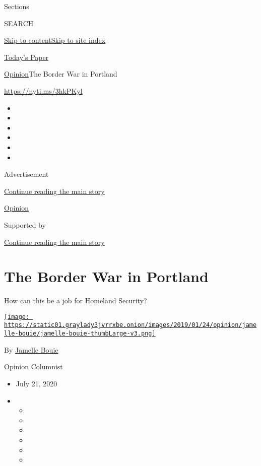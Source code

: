 Sections

SEARCH

\protect\hyperlink{site-content}{Skip to
content}\protect\hyperlink{site-index}{Skip to site index}

\href{https://myaccount.nytimes3xbfgragh.onion/auth/login?response_type=cookie\&client_id=vi}{}

\href{https://www.nytimes3xbfgragh.onion/section/todayspaper}{Today's
Paper}

\href{/section/opinion}{Opinion}\textbar{}The Border War in Portland

\href{https://nyti.ms/3hkPKyl}{https://nyti.ms/3hkPKyl}

\begin{itemize}
\item
\item
\item
\item
\item
\item
\end{itemize}

Advertisement

\protect\hyperlink{after-top}{Continue reading the main story}

\href{/section/opinion}{Opinion}

Supported by

\protect\hyperlink{after-sponsor}{Continue reading the main story}

\hypertarget{the-border-war-in-portland}{%
\section{The Border War in Portland}\label{the-border-war-in-portland}}

How can this be a job for Homeland Security?

\href{https://www.nytimes3xbfgragh.onion/column/jamelle-bouie}{\texttt{[image: https://static01.graylady3jvrrxbe.onion/images/2019/01/24/opinion/jamelle-bouie/jamelle-bouie-thumbLarge-v3.png]}}

By
\href{https://www.nytimes3xbfgragh.onion/column/jamelle-bouie}{Jamelle
Bouie}

Opinion Columnist

\begin{itemize}
\item
  July 21, 2020
\item
  \begin{itemize}
  \item
  \item
  \item
  \item
  \item
  \item
  \end{itemize}
\end{itemize}

